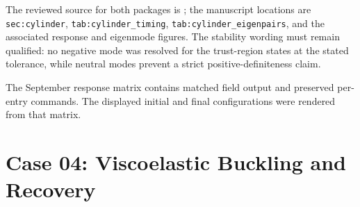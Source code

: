 \documentclass[11pt]{article}
\begin{document}
The reviewed source for both packages is
; the manuscript locations are
\texttt{sec:cylinder}, \texttt{tab:cylinder\_timing},
\texttt{tab:cylinder\_eigenpairs}, and the associated response and eigenmode
figures.  The stability wording must remain qualified: no negative mode was
resolved for the trust-region states at the stated tolerance, while neutral
modes prevent a strict positive-definiteness claim.

The September response matrix contains matched field output and preserved
per-entry commands.  The displayed initial and final configurations were rendered
from that matrix.

\section*{Case 04: Viscoelastic Buckling and Recovery}
\end{document}
